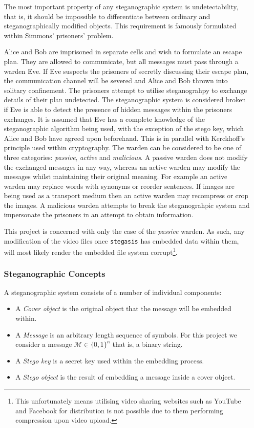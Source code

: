 \documentclass[paper=a4, fontsize=11pt,twoside]{scrartcl}    %
\numberwithin{table}{section}
\numberwithin{figure}{section}
\numberwithin{algorithm}{section}
\begin{document}
\noindent
The most important property of any steganographic system is undetectability, that is, it should be impossible to differentiate between ordinary and steganographically modified objects. This requirement is famously formulated within Simmons' prisoners' problem. 

Alice and Bob are imprisoned in separate cells and wish to formulate an escape plan. They are allowed to communicate, but all messages must pass through a warden Eve. If Eve suspects the prisoners of secretly discussing their escape plan, the communication channel will be severed and Alice and Bob thrown into solitary confinement. The prisoners attempt to utilise steganograhpy to exchange details of their plan undetected. The steganographic system is considered broken if Eve is able to detect the presence of hidden messages within the prisoners exchanges. It is assumed that Eve has a complete knowledge of the steganographic algorithm being used, with the exception of the stego key, which Alice and Bob have agreed upon beforehand. This is in parallel with Kerckhoff's principle used within cryptography. The warden can be considered to be one of three categories: \textit{passive}, \textit{active} and \textit{malicious}. A passive warden does not modify the exchanged messages in any way, whereas an active warden may modify the messages whilst maintaining their original meaning. For example an active warden may replace words with synonyms or reorder sentences. If images are being used as a transport medium then an active warden may recompress or crop the images. A malicious warden attempts to break the steganograhpic system and impersonate the prisoners in an attempt to obtain information.

This project is concerned with only the case of the \textit{passive} warden. As such, any modification of the video files once \texttt{stegasis} has embedded data within them, will most likely render the embedded file system corrupt\footnote{This unfortunately means utilising video sharing websites such as YouTube and Facebook for distribution is not possible due to them performing compression upon video upload.}.


\subsubsection{Steganographic Concepts}
A steganographic system consists of a number of individual components:
\begin{itemize}
	\item A \textit{Cover object} is the original object that the message will be embedded within.
	\item A \textit{Message} is an arbitrary length sequence of symbols. For this project we consider a message $\mathcal{M} \in \{0,1\}^{n} $ that is, a binary string.
	\item A \textit{Stego key} is a secret key used within the embedding process.
	\item A \textit{Stego object} is the result of embedding a message inside a cover object.
\end{itemize}
\end{document}
